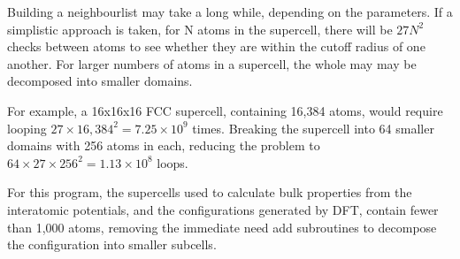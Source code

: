 \documentclass[12pt,twoside]{manual}
\begin{document}
Building a neighbourlist may take a long while, depending on the parameters.  If a simplistic approach is taken, for N atoms in the supercell, there will be $27N^2$ checks between atoms to see whether they are within the cutoff radius of one another.  For larger numbers of atoms in a supercell, the whole may may be decomposed into smaller domains.

For example, a 16x16x16 FCC supercell, containing 16,384 atoms, would require looping $27 \times 16,384^2 = 7.25 \times 10^9$ times.  Breaking the supercell into 64 smaller domains with 256 atoms in each, reducing the problem to $64 \times 27 \times 256^2 = 1.13 \times 10^8$ loops.

For this program, the supercells used to calculate bulk properties from the interatomic potentials, and the configurations generated by DFT, contain fewer than 1,000 atoms, removing the immediate need add subroutines to decompose the configuration into smaller subcells.
\end{document}
